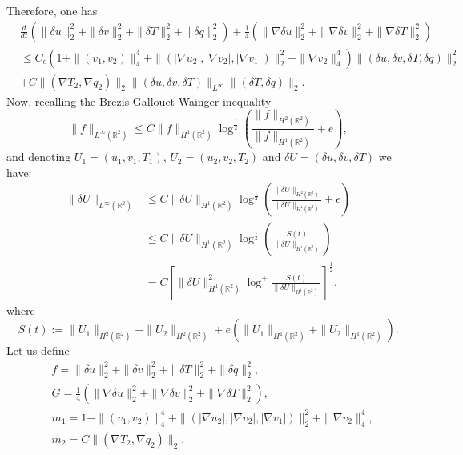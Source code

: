 \documentclass[11pt, a4paper, article,reqno,]{amsart}
\theoremstyle{remark}
\numberwithin{equation}{section}
\begin{document}
Therefore, one has
\begin{equation*}
    \begin{aligned}
        & \frac{d}{dt} \left( \|\delta u\|_2^2 + \|\delta v\|_2^2 + \|\delta T\|_2^2 + \|\delta q\|_2^2 \right) + \frac{1}{4} (\|\nabla \delta u\|_2^2 + \|\nabla \delta v\|_2^2 + \|\nabla \delta T\|_2^2) \\
        & \leq C_\epsilon( 1 +  \|(v_1,v_2)\|_4^4 + \|(|\nabla u_2|, |\nabla v_2|,|\nabla v_1|)\|_2^2 + \|\nabla v_2\|_4^4) \|(\delta u, \delta v, \delta T, \delta q)\|_2^2 \\
        &+  C \|(\nabla T_{2}, \nabla q_2)\|_2 \|(\delta u, \delta v,\delta T)\|_{L^{\infty}} \|(\delta T,\delta q)\|_2.
    \end{aligned}
\end{equation*}
Now, recalling the Brezis-Gallouet-Wainger inequality 
\begin{equation*}
    \|f\|_{L^{\infty}(\mathbb{R}^2)} \leq C \|f\|_{H^1(\mathbb{R}^2)}\log^{\frac{1}{2}}\left( \frac{\|f\|_{H^2(\mathbb{R}^2)}}{\|f\|_{H^1(\mathbb{R}^2)}} + e\right),
\end{equation*}
and denoting $U_1=(u_1,v_1,T_1)$, $U_2=(u_2,v_2,T_2)$ and $\delta U = (\delta u, \delta v,\delta T)$ we have:
\begin{equation*}
\begin{aligned}
    \|\delta U\|_{L^{\infty}(\mathbb{R}^2)} & \leq C \|\delta U\|_{H^1(\mathbb{R}^2)}\log^{\frac{1}{2}}\left( \frac{\|\delta U\|_{H^2(\mathbb{R}^2)}}{\|\delta U\|_{H^1(\mathbb{R}^2)}} + e\right) \\
    & \leq  C \|\delta U\|_{H^1(\mathbb{R}^2)}\log^{\frac{1}{2}}\left( \frac{S(t)}{\|\delta U\|_{H^1(\mathbb{R}^2)}} \right)\\
    & = C \left[ \|\delta U\|^2_{H^1(\mathbb{R}^2)} \log^{+}\frac{S(t)}{\|\delta U\|_{H^1(\mathbb{R}^2)}} \right]^{\frac{1}{2}},
\end{aligned}
\end{equation*}
where $$S(t) := \|U_1\|_{H^2(\mathbb{R}^2)} + \|U_2\|_{H^2(\mathbb{R}^2)} + e\left(\|U_1\|_{H^1(\mathbb{R}^2)}+ \|U_2\|_{H^1(\mathbb{R}^2)}\right).$$
Let us define
\begin{equation*}
    \begin{aligned}
        & f = \|\delta u\|_2^2 + \|\delta v\|_2^2 + \|\delta T\|_2^2 + \|\delta q\|_2^2, \\
        & G= \frac{1}{4}\left( \|\nabla \delta u\|_2^2 + \|\nabla \delta v\|_2^2 + \|\nabla \delta T\|_2^2 \right), \\
        &m_1=  1 +  \|(v_1,v_2)\|_4^4 + \|(|\nabla u_2|, |\nabla v_2|,|\nabla v_1|)\|_2^2 + \|\nabla v_2\|_4^4, \\
        & m_2= C\|(\nabla T_{2}, \nabla q_2)\|_2, 
    \end{aligned}
\end{equation*}
\end{document}
